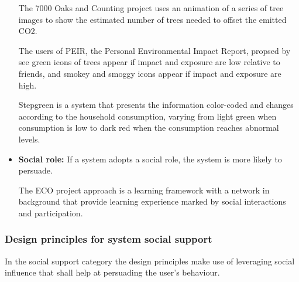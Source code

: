 \begin{itemize}
	The 7000 Oaks and Counting project \cite{holmes2007eco} uses an animation of a series of tree images to show the estimated number of trees needed to offset the emitted CO2.
	
	The users of PEIR, the Personal Environmental Impact Report, propsed by \cite{mun2009peir} see green icons of trees appear if impact and exposure are low relative to friends, and smokey and smoggy icons
	appear if impact and exposure are high.
	
	Stepgreen \cite{pereira2012design} is a system that presents the information color-coded and changes according to the household
	consumption, varying from light green when consumption is low to dark red when the consumption reaches abnormal levels.
	
	\item \textbf{Social role:}
	If a system adopts a social	role, the system is more likely to persuade.

	The ECO project approach is a learning framework with a network in background that \cite{brouns2014networked} provide learning experience marked by social interactions and participation.
	
	 
\end{itemize}

\subsubsection{Design principles for system social support}

In the social support category the design principles make use of leveraging social influence that shall help at persuading the user's behaviour.


